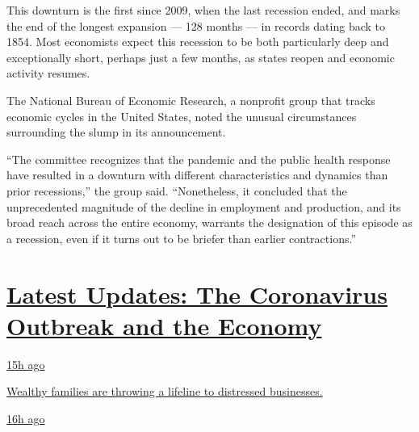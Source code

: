 This downturn is the first since 2009, when the last recession ended,
and marks the end of the longest expansion --- 128 months --- in records
dating back to 1854. Most economists expect this recession to be both
particularly deep and exceptionally short, perhaps just a few months, as
states reopen and economic activity resumes.

The National Bureau of Economic Research, a nonprofit group that tracks
economic cycles in the United States, noted the unusual circumstances
surrounding the slump in its announcement.

``The committee recognizes that the pandemic and the public health
response have resulted in a downturn with different characteristics and
dynamics than prior recessions,'' the group said. ``Nonetheless, it
concluded that the unprecedented magnitude of the decline in employment
and production, and its broad reach across the entire economy, warrants
the designation of this episode as a recession, even if it turns out to
be briefer than earlier contractions.''

\hypertarget{latest-updates-the-coronavirus-outbreak-and-the-economy}{%
\section{\texorpdfstring{\href{https://www.nytimes.com/live/2020/08/07/business/stock-market-today-coronavirus?action=click\&pgtype=Article\&state=default\&region=MAIN_CONTENT_1\&context=storylines_live_updates}{Latest
Updates: The Coronavirus Outbreak and the
Economy}}{Latest Updates: The Coronavirus Outbreak and the Economy}}\label{latest-updates-the-coronavirus-outbreak-and-the-economy}}

\href{https://www.nytimes.com/live/2020/08/07/business/stock-market-today-coronavirus?action=click\&pgtype=Article\&state=default\&region=MAIN_CONTENT_1\&context=storylines_live_updates\#wealthy-families-are-throwing-a-lifeline-to-distressed-businesses}{15h
ago}

\href{https://www.nytimes.com/live/2020/08/07/business/stock-market-today-coronavirus?action=click\&pgtype=Article\&state=default\&region=MAIN_CONTENT_1\&context=storylines_live_updates\#wealthy-families-are-throwing-a-lifeline-to-distressed-businesses}{Wealthy
families are throwing a lifeline to distressed businesses.}

\href{https://www.nytimes.com/live/2020/08/07/business/stock-market-today-coronavirus?action=click\&pgtype=Article\&state=default\&region=MAIN_CONTENT_1\&context=storylines_live_updates\#the-publisher-of-the-onion-jezebel-and-other-websites-lays-off-15-employees}{16h
ago}

